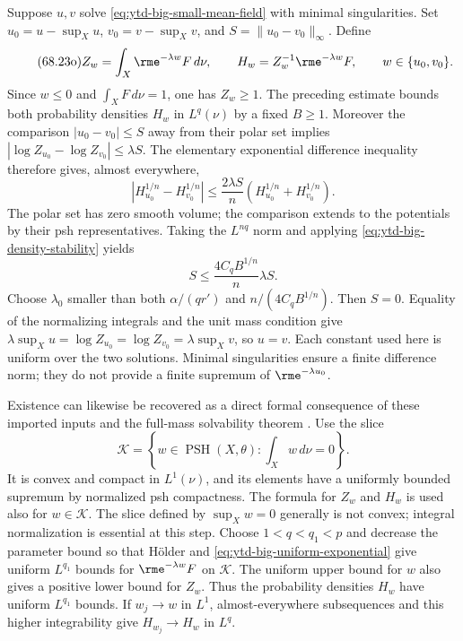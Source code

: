 Suppose $u,v$ solve \eqref{eq:ytd-big-small-mean-field} with
minimal singularities. Set $u_0=u-\sup_Xu$, $v_0=v-\sup_Xv$,
and $S=\|u_0-v_0\|_\infty$. Define
\[
\tag{68.23o}\label{eq:ytd-big-normalized-densities}
 Z_w=\int_X\rme^{-\lambda w}F\,d\nu,
 \qquad H_w=Z_w^{-1}\rme^{-\lambda w}F,
 \qquad w\in\{u_0,v_0\}.
\]
Since $w\leq0$ and $\int_XF\,d\nu=1$, one has $Z_w\geq1$.
The preceding estimate bounds both probability densities $H_w$
in $L^q(\nu)$ by a fixed $B\geq1$. Moreover the comparison
$|u_0-v_0|\leq S$ away from their polar set implies
$|\log Z_{u_0}-\log Z_{v_0}|\leq\lambda S$.
The elementary exponential difference inequality therefore gives,
almost everywhere,
\[
 |H_{u_0}^{1/n}-H_{v_0}^{1/n}|
 \leq\frac{2\lambda S}{n}
                 (H_{u_0}^{1/n}+H_{v_0}^{1/n}).
\]
The polar set has zero smooth volume; the comparison extends to
the potentials by their psh representatives. Taking the $L^{nq}$
norm and applying \eqref{eq:ytd-big-density-stability} yields
\[
\tag{68.23p}\label{eq:ytd-big-weighted-contraction}
 S\leq\frac{4C_qB^{1/n}}n\lambda S.
\]
Choose $\lambda_0$ smaller than both $\alpha/(qr')$ and
$n/(4C_qB^{1/n})$. Then $S=0$. Equality of the normalizing
integrals and the unit mass condition give
$\lambda\sup_Xu=\log Z_{u_0}=\log Z_{v_0}=\lambda\sup_Xv$,
so $u=v$. Each constant used here is uniform over the two
solutions. Minimal singularities ensure a finite difference norm;
they do not provide a finite supremum of $\rme^{-\lambda u_0}$.

Existence can likewise be recovered as a direct formal consequence
of these imported inputs and the full-mass solvability theorem
\cite[Theorem~A]{BEGZ10BigV2}. Use the slice
\[
 \mathcal K=\left\{w\in\operatorname{PSH}(X,\theta):
                            \int_Xw\,d\nu=0\right\}.
\]
It is convex and compact in $L^1(\nu)$, and its elements have a
uniformly bounded supremum by normalized psh compactness.
The formula for $Z_w$ and $H_w$ is used also for $w\in\mathcal K$.
The slice defined by $\sup_Xw=0$ generally is not convex;
integral normalization is essential at this step.
Choose $1<q<q_1<p$ and decrease the parameter bound so that
H\"older and \eqref{eq:ytd-big-uniform-exponential} give uniform
$L^{q_1}$ bounds for $\rme^{-\lambda w}F$ on $\mathcal K$.
The uniform upper bound for $w$ also gives a positive lower bound
for $Z_w$. Thus the probability densities $H_w$ have uniform
$L^{q_1}$ bounds. If $w_j\to w$ in $L^1$, almost-everywhere
subsequences and this higher integrability give
$H_{w_j}\to H_w$ in $L^q$.

